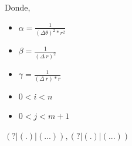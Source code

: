 Donde, 
\begin{itemize}
    \item $\alpha = \frac{1}{(\Delta\theta)^2 * r^2}$
    \item $\beta = \frac{1}{(\Delta\ r)^2}$
    \item $\gamma = \frac{1}{(\Delta\ r) * r}$
    \item $0 < i < n$
    \item $0 < j < m+1$
\end{itemize}\((?|(.)|(...)),(?|(.)|(...))\)